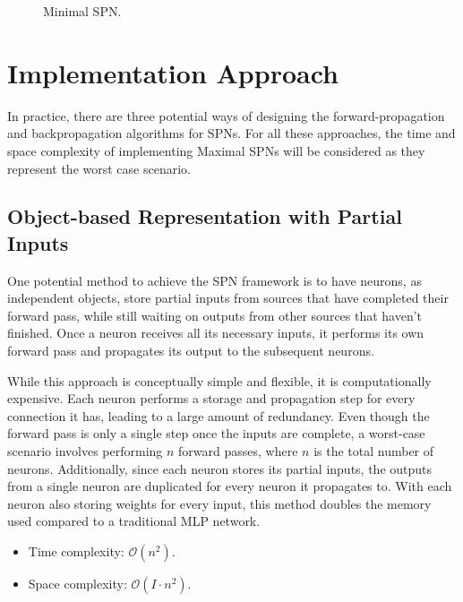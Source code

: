 \begin{figure}[h!]
\begin{minipage}[t]{0.46\textwidth}
        \caption{Minimal SPN.}
        \label{fig:minSpn}
    \end{minipage}
\end{figure}

\section{Implementation Approach}

In practice, there are three potential ways of designing the forward-propagation and backpropagation algorithms for SPNs. For all these approaches, the time and space complexity of implementing Maximal SPNs will be considered as they represent the worst case scenario.

\subsection{Object-based Representation with Partial Inputs}

One potential method to achieve the SPN framework is to have neurons, as independent objects, store partial inputs from sources that have completed their forward pass, while still waiting on outputs from other sources that haven't finished. Once a neuron receives all its necessary inputs, it performs its own forward pass and propagates its output to the subsequent neurons.
 
While this approach is conceptually simple and flexible, it is computationally expensive. Each neuron performs a storage and propagation step for every connection it has, leading to a large amount of redundancy. Even though the forward pass is only a single step once the inputs are complete, a worst-case scenario involves performing $n$ forward passes, where $n$ is the total number of neurons. Additionally, since each neuron stores its partial inputs, the outputs from a single neuron are duplicated for every neuron it propagates to. With each neuron also storing weights for every input, this method doubles the memory used compared to a traditional MLP network.

\begin{itemize}
    \item Time complexity: $\mathcal{O}(n^2)$.
    \item Space complexity: $\mathcal{O}(I \cdot n^2)$.
\end{itemize}



